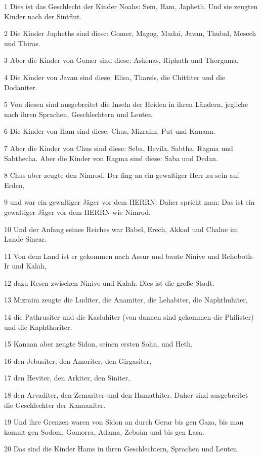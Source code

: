 \par 1 Dies ist das Geschlecht der Kinder Noahs: Sem, Ham, Japheth. Und sie zeugten Kinder nach der Sintflut.
\par 2 Die Kinder Japheths sind diese: Gomer, Magog, Madai, Javan, Thubal, Mesech und Thiras.
\par 3 Aber die Kinder von Gomer sind diese: Askenas, Riphath und Thorgama.
\par 4 Die Kinder von Javan sind diese: Elisa, Tharsis, die Chittiter und die Dodaniter.
\par 5 Von diesen sind ausgebreitet die Inseln der Heiden in ihren Ländern, jegliche nach ihren Sprachen, Geschlechtern und Leuten.
\par 6 Die Kinder von Ham sind diese: Chus, Mizraim, Put und Kanaan.
\par 7 Aber die Kinder von Chus sind diese: Seba, Hevila, Sabtha, Ragma und Sabthecha. Aber die Kinder von Ragma sind diese: Saba und Dedan.
\par 8 Chus aber zeugte den Nimrod. Der fing an ein gewaltiger Herr zu sein auf Erden,
\par 9 und war ein gewaltiger Jäger vor dem HERRN. Daher spricht man: Das ist ein gewaltiger Jäger vor dem HERRN wie Nimrod.
\par 10 Und der Anfang seines Reiches war Babel, Erech, Akkad und Chalne im Lande Sinear.
\par 11 Von dem Land ist er gekommen nach Assur und baute Ninive und Rehoboth-Ir und Kalah,
\par 12 dazu Resen zwischen Ninive und Kalah. Dies ist die große Stadt.
\par 13 Mizraim zeugte die Luditer, die Anamiter, die Lehabiter, die Naphthuhiter,
\par 14 die Pathrusiter und die Kasluhiter (von dannen sind gekommen die Philister) und die Kaphthoriter.
\par 15 Kanaan aber zeugte Sidon, seinen ersten Sohn, und Heth,
\par 16 den Jebusiter, den Amoriter, den Girgasiter,
\par 17 den Heviter, den Arkiter, den Siniter,
\par 18 den Arvaditer, den Zemariter und den Hamathiter. Daher sind ausgebreitet die Geschlechter der Kanaaniter.
\par 19 Und ihre Grenzen waren von Sidon an durch Gerar bis gen Gaza, bis man kommt gen Sodom, Gomorra, Adama, Zeboim und bis gen Lasa.
\par 20 Das sind die Kinder Hams in ihren Geschlechtern, Sprachen und Leuten.
